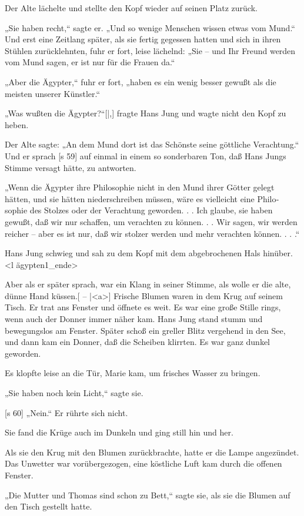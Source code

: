 Der Alte lächelte und stellte den Kopf wieder
auf seinen Platz zurück.

„Sie haben recht,“ sagte er. „Und so wenige
Menschen wissen etwas vom Mund.“ Und erst eine
Zeitlang später, als sie fertig gegessen hatten und
sich in ihren Stühlen zurücklehnten, fuhr er fort, leise
lächelnd: „Sie – und Ihr Freund werden vom Mund
sagen, er ist nur für die Frauen da.“

„Aber die Ägypter,“ fuhr er fort, „haben es
ein wenig besser gewußt als die meisten unserer
Künstler.“

„Was wußten die Ägypter?“[|,] fragte Hans Jung
und wagte nicht den Kopf zu heben.

Der Alte sagte: „An dem Mund dort ist das
Schönste seine göttliche Verachtung.“ Und er sprach
[s 59]
auf einmal in einem so sonderbaren Ton, daß Hans
Jungs Stimme versagt hätte, zu antworten.

„Wenn die Ägypter ihre Philosophie nicht in
den Mund ihrer Götter gelegt hätten, und sie hätten
niederschreiben müssen, wäre es vielleicht eine Philo­
sophie des Stolzes oder der Verachtung geworden. . .
Ich glaube, sie haben gewußt, daß wir nur schaffen,
um verachten zu können. . . Wir sagen, wir werden
reicher – aber es ist nur, daß wir stolzer werden
und mehr verachten können. . . .“

Hans Jung schwieg und sah zu dem Kopf mit
dem abgebrochenen Hals hinüber.<l ägypten1_ende>

Aber als er später sprach, war ein Klang in
seiner Stimme, als wolle er die alte, dünne Hand
küssen.[ –
|<a>]
Frische Blumen waren in dem Krug auf seinem
Tisch. Er trat ans Fenster und öffnete es weit. Es
war eine große Stille rings, wenn auch der Donner
immer näher kam. Hans Jung stand stumm und
bewegungslos am Fenster. Später schoß ein greller
Blitz vergehend in den See, und dann kam ein
Donner, daß die Scheiben klirrten. Es war ganz
dunkel geworden.

Es klopfte leise an die Tür, Marie kam, um
frisches Wasser zu bringen.

„Sie haben noch kein Licht,“ sagte sie.

[s 60]
„Nein.“ Er rührte sich nicht.

Sie fand die Krüge auch im Dunkeln und ging
still hin und her.

Als sie den Krug mit den Blumen zurückbrachte,
hatte er die Lampe angezündet. Das Unwetter war
vorübergezogen, eine köstliche Luft kam durch die
offenen Fenster.

„Die Mutter und Thomas sind schon zu Bett,“
sagte sie, als sie die Blumen auf den Tisch gestellt
hatte.


